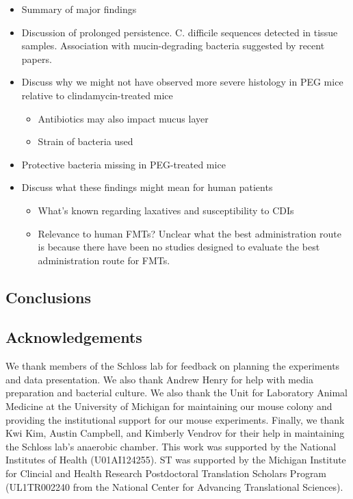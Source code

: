 \documentclass[
  11pt,
]{article}
\providecommand{\tightlist}{%
  \setlength{\itemsep}{0pt}\setlength{\parskip}{0pt}}
\begin{document}
\begin{itemize}
\item
  Summary of major findings
\item
  Discussion of prolonged persistence. C. difficile sequences detected
  in tissue samples. Association with mucin-degrading bacteria suggested
  by recent papers.
\item
  Discuss why we might not have observed more severe histology in PEG
  mice relative to clindamycin-treated mice

  \begin{itemize}
  \tightlist
  \item
    Antibiotics may also impact mucus layer
  \item
    Strain of bacteria used
  \end{itemize}
\item
  Protective bacteria missing in PEG-treated mice
\item
  Discuss what these findings might mean for human patients

  \begin{itemize}
  \tightlist
  \item
    What's known regarding laxatives and susceptibility to CDIs
  \item
    Relevance to human FMTs? Unclear what the best administration route
    is because there have been no studies designed to evaluate the best
    administration route for FMTs.
  \end{itemize}
\end{itemize}

\hypertarget{conclusions}{%
\subsection{Conclusions}\label{conclusions}}

\hypertarget{acknowledgements}{%
\subsection{Acknowledgements}\label{acknowledgements}}

We thank members of the Schloss lab for feedback on planning the
experiments and data presentation. We also thank Andrew Henry for help
with media preparation and bacterial culture. We also thank the Unit for
Laboratory Animal Medicine at the University of Michigan for maintaining
our mouse colony and providing the institutional support for our mouse
experiments. Finally, we thank Kwi Kim, Austin Campbell, and Kimberly
Vendrov for their help in maintaining the Schloss lab's anaerobic
chamber. This work was supported by the National Institutes of Health
(U01AI124255). ST was supported by the Michigan Institute for Clincial
and Health Research Postdoctoral Translation Scholars Program
(UL1TR002240 from the National Center for Advancing Translational
Sciences).
\end{document}
